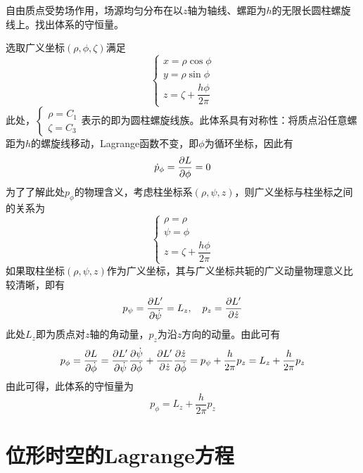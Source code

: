 \begin{example}
自由质点受势场作用，场源均匀分布在以$z$轴为轴线、螺距为$h$的无限长圆柱螺旋线上。找出体系的守恒量。
\end{example}
\begin{solution}
选取广义坐标$(\rho,\phi,\zeta)$满足
\begin{equation*}
\begin{cases}
	x = \rho \cos \phi \\
	y = \rho \sin \phi \\
	z = \zeta + \dfrac{h\phi}{2\pi}
\end{cases}
\end{equation*}
此处，$\begin{cases} \rho = C_1 \\ \zeta = C_3 \end{cases}$表示的即为圆柱螺旋线族。此体系具有对称性：将质点沿任意螺距为$h$的螺旋线移动，Lagrange函数不变，即$\phi$为循环坐标，因此有
\begin{equation*}
	\dot{p}_\phi = \frac{\partial L}{\partial \phi} = 0
\end{equation*}
为了了解此处$p_\phi$的物理含义，考虑柱坐标系$(\rho,\psi,z)$，则广义坐标与柱坐标之间的关系为
\begin{equation*}
\begin{cases}
	\rho = \rho \\
	\psi = \phi \\
	z = \zeta + \dfrac{h\phi}{2\pi}
\end{cases}
\end{equation*}
如果取柱坐标$(\rho,\psi,z)$作为广义坐标，其与广义坐标共轭的广义动量物理意义比较清晰，即有
\begin{equation*}
	p_\psi = \frac{\partial L'}{\partial \dot{\psi}} = L_z,\quad p_z = \frac{\partial L'}{\partial \dot{z}}
\end{equation*}
此处$L_z$即为质点对$z$轴的角动量，$p_z$为沿$z$方向的动量。由此可有
\begin{equation*}
	p_\phi = \frac{\partial L}{\partial \dot{\phi}} = \frac{\partial L'}{\partial \dot{\psi}} \frac{\partial \dot{\psi}}{\partial \dot{\phi}} + \frac{\partial L'}{\partial \dot{z}} \frac{\partial \dot{z}}{\partial \dot{\phi}} = p_\psi + \frac{h}{2\pi} p_z = L_z + \frac{h}{2\pi} p_z
\end{equation*}
由此可得，此体系的守恒量为
\begin{equation*}
	p_\phi = L_z + \frac{h}{2\pi} p_z
\end{equation*}
\end{solution}

\section{位形时空的Lagrange方程}

